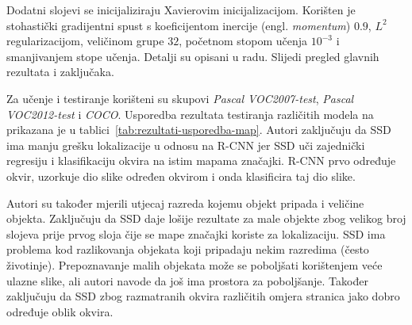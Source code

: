\documentclass[utf8, seminar, numeric, lmodern]{feri}
\begin{document}
Dodatni slojevi se inicijaliziraju Xavierovim inicijalizacijom. Korišten je stohastički gradijentni spust s koeficijentom inercije (engl. \emph{momentum}) $0.9$, $L^2$ regularizacijom, veličinom grupe $32$, početnom stopom učenja $10^{-3}$ i smanjivanjem stope učenja. Detalji su opisani u radu. Slijedi pregled glavnih rezultata i zaključaka.

Za učenje i testiranje korišteni su skupovi \emph{Pascal VOC2007-test}, \emph{Pascal VOC2012-test} i \emph{COCO}. Usporedba rezultata testiranja različitih modela na prikazana je u tablici~\ref{tab:rezultati-usporedba-map}. Autori zaključuju da SSD ima manju grešku lokalizacije u odnosu na R-CNN jer SSD uči zajednički regresiju i klasifikaciju okvira na istim mapama značajki. R-CNN prvo određuje okvir, uzorkuje dio slike određen okvirom i onda klasificira taj dio slike. 

Autori su također mjerili utjecaj razreda kojemu objekt pripada i veličine objekta. Zaključuju da SSD daje lošije rezultate za male objekte zbog velikog broj slojeva prije prvog sloja čije se mape značajki koriste za lokalizaciju. SSD ima problema kod razlikovanja objekata koji pripadaju nekim razredima (često životinje). Prepoznavanje malih objekata može se poboljšati korištenjem veće ulazne slike, ali autori navode da još ima prostora za poboljšanje. Također zaključuju da SSD zbog razmatranih okvira različitih omjera stranica jako dobro određuje oblik okvira.

\end{document}
